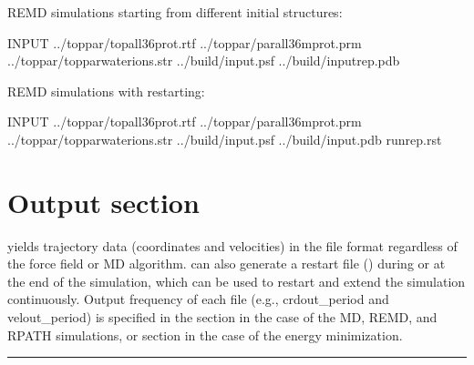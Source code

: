 \documentclass[a4paper,11pt,oneside,english]{sphinxmanual}
\begin{document}
REMD simulations starting from different initial structures:

\begin{sphinxVerbatim}[commandchars=\\\{\}]
\PYG{o}{[}INPUT\PYG{o}{]}
  ../toppar/top\PYGZus{}all36\PYGZus{}prot.rtf
  ../toppar/par\PYGZus{}all36m\PYGZus{}prot.prm
  ../toppar/toppar\PYGZus{}water\PYGZus{}ions.str
  ../build/input.psf
  ../build/input\PYGZus{}rep.pdb
\end{sphinxVerbatim}

REMD simulations with restarting:

\begin{sphinxVerbatim}[commandchars=\\\{\}]
\PYG{o}{[}INPUT\PYG{o}{]}
  ../toppar/top\PYGZus{}all36\PYGZus{}prot.rtf
  ../toppar/par\PYGZus{}all36m\PYGZus{}prot.prm
  ../toppar/toppar\PYGZus{}water\PYGZus{}ions.str
  ../build/input.psf
  ../build/input.pdb
  run\PYGZus{}rep.rst
\end{sphinxVerbatim}


\chapter{Output section}
\label{\detokenize{04_Output:output-section}}\label{\detokenize{04_Output:output}}\label{\detokenize{04_Output::doc}}
 yields trajectory data (coordinates and velocities)
in the  file format regardless of the force field or MD algorithm.
 can also generate a restart file ()
during or at the end of the simulation,
which can be used to restart and extend the simulation continuously.
Output frequency of each file (e.g., crdout\_period and velout\_period)
is specified in the \sphinxstylestrong{{[}DYNAMICS{]}} section in the case of the MD,
REMD, and RPATH simulations, or \sphinxstylestrong{{[}MINIMIZE{]}} section in the case of
the energy minimization.


\bigskip\hrule\bigskip
\end{document}
